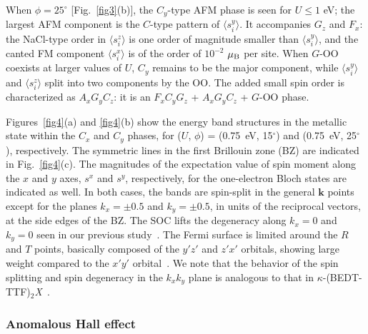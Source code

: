 \documentclass[aps,twocolumn,prb,preprintnumbers,amsmath,amssymb]{revtex4-2}
\begin{document}
When $\phi=25^\circ$ [Fig.~\ref{fig3}(b)],  
 the $C_y$-type AFM phase is seen for $U \leq 1$ eV; the largest AFM component is the $C$-type pattern of $\langle s_i^y \rangle$. 
It accompanies $G_z$ and $F_x$: the NaCl-type order in $\langle s_i^z \rangle$ is one order of magnitude smaller than $\langle s_i^y\rangle$, and the canted FM component $\langle s_i^x \rangle$ is of the order of $10^{-2}$ $\mu_{\rm B}$ per site. 
When $G$-OO coexists at larger values of $U$,
 $C_y$ remains to be the major component, 
 while $\langle s_i^y \rangle$ and  $\langle s_i^z \rangle$ split into two components by the OO. 
The added small spin order is characterized as $A_x G_y C_z$: it is an $F_x C_y G_z$ +  $A_x G_y C_z$ + $G$-OO phase. 

Figures~\ref{fig4}(a) and \ref{fig4}(b) show the energy band structures in the metallic state within the $C_x$ and $C_y$ phases, 
 for ($U$, $\phi$) =  (0.75~eV, 15$^\circ$) and  (0.75~eV, 25$^\circ$), respectively. 
The symmetric lines in the first Brillouin zone (BZ) are indicated in Fig.~\ref{fig4}(c). 
The magnitudes of the expectation value of spin moment along the $x$ and $y$ axes, 
 $s^x$ and $s^y$, respectively, for the one-electron Bloch states are indicated as well. 
In both cases, the bands are spin-split in the general $\bm k$ points except for the planes
 $k_x = \pm 0.5$ and $k_y = \pm 0.5$, in units of the reciprocal vectors, at the side edges of the BZ. 
The SOC lifts the degeneracy along $k_x = 0$ and $k_y = 0$ seen in our previous study~\cite{naka3}. 
The Fermi surface is limited around the $R$ and $T$ points,
 basically composed of the $y'z'$ and $z'x'$ orbitals, 
 showing large weight compared to the $x'y'$ orbital~\cite{naka3}. 
We note that the behavior of the spin splitting and spin degeneracy in the $k_x k_y$ plane is 
 analogous to that in $\kappa$-(BEDT-TTF)$_2${\it X}~\cite{naka,naka2,seo}.

\subsubsection{Anomalous Hall effect}\label{d2:AHE}
\end{document}
